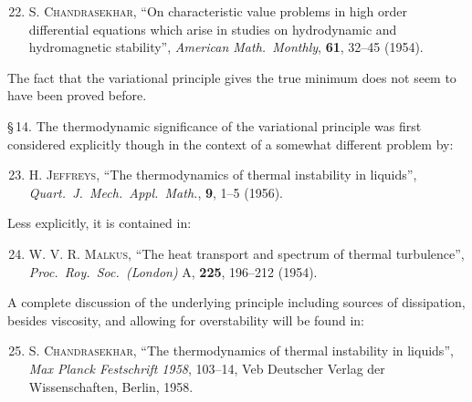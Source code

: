 \begin{enumerate}
\setcounter{enumi}{21}

\item \textsc{S. Chandrasekhar}, ``On characteristic value problems in high order
  differential equations which arise in studies on hydrodynamic and hydromagnetic
  stability'', \textit{American Math.\ Monthly}, \textbf{61}, 32--45 (1954).

\end{enumerate}

\noindent The fact that the variational principle gives the true minimum does not seem to
have been proved before.

\noindent \S\,14. The thermodynamic significance of the variational principle was first
considered explicitly though in the context of a somewhat different problem by:

\begin{enumerate}
\setcounter{enumi}{22}

\item \textsc{H. Jeffreys}, ``The thermodynamics of thermal instability in liquids'',
  \textit{Quart.\ J.\ Mech.\ Appl.\ Math.}, \textbf{9}, 1--5 (1956).

\end{enumerate}

\noindent Less explicitly, it is contained in:

\begin{enumerate}
\setcounter{enumi}{23}

\item \textsc{W. V. R. Malkus}, ``The heat transport and spectrum of thermal turbulence'',
  \textit{Proc.\ Roy.\ Soc.\ (London)} A, \textbf{225}, 196--212 (1954).

\end{enumerate}

\noindent A complete discussion of the underlying principle including sources of dissipation,
besides viscosity, and allowing for overstability will be found in:

\begin{enumerate}
\setcounter{enumi}{24}

\item \textsc{S. Chandrasekhar}, ``The thermodynamics of thermal instability in liquids'',
  \textit{Max Planck Festschrift 1958}, 103--14, Veb Deutscher Verlag der Wissenschaften,
  Berlin, 1958.

\end{enumerate}

